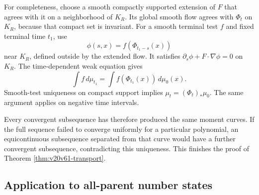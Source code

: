 \documentclass[11pt]{article}
\theoremstyle{remark}
\begin{document}
For completeness, choose a smooth compactly supported
extension of \(F\) that agrees with it on a neighborhood
of \(K_R\).  Its global smooth flow agrees with \(\Phi_t\)
on \(K_R\), because that compact set is invariant.
For a smooth terminal test \(f\) and fixed terminal
time \(t_1\), use
\[
 \phi(s,x)=f(\Phi_{t_1-s}(x))
\]
near \(K_R\), defined outside by the extended flow.
It satisfies \(\partial_s\phi+F\cdot\nabla\phi=0\)
on \(K_R\).  The time-dependent weak equation gives
\[
 \int f\,d\mu_{t_1}=\int f(\Phi_{t_1}(x))\,d\mu_0(x).
\]
Smooth-test uniqueness on compact support implies
\(\mu_t=(\Phi_t)_*\mu_0\).  The same argument applies
on negative time intervals.

Every convergent subsequence has therefore produced the
same moment curves.  If the full sequence failed to
converge uniformly for a particular polynomial, an
equicontinuous subsequence separated from that curve
would have a further convergent subsequence, contradicting
this uniqueness.  This finishes the proof of
Theorem \ref{thm:v20v61-transport}.

\subsection{Application to all-parent number states}
\end{document}
